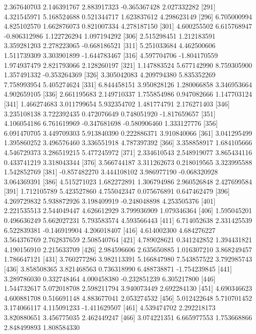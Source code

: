 \documentclass[12pt]{article}
\begin{document}
\begin{Schunk}
\begin{Soutput}
 [286]  2.367640703  2.146391767  2.883917323 -0.365367428  2.027332282
 [291]  4.321545971  5.168524688  0.521344717  1.623837612  4.298623149
 [296]  6.705000994  4.825102570  1.662876073  0.821007334  4.278187150
 [301]  4.600255502  6.615768947 -0.806312986  1.122726294  1.097194292
 [306]  2.515298451  1.212183591  3.359281203  2.278223065 -0.668186521
 [311]  5.251033684  4.462500606  1.511739309  3.303901899 -1.644783467
 [316]  4.597704706 -1.804170559  1.974937479  2.821793066  2.128260197
 [321]  1.147883524  5.677142990  8.759305900  1.357491332 -0.353264369
 [326]  3.305042083  4.209794380  5.835352269  7.758993954  5.405274624
 [331]  6.844458151  3.950828126  1.280066858  3.346953664  4.902659105
 [336]  2.661195683  2.149710337  1.755854986  0.947082666  1.147703124
 [341]  1.466274683  3.011799654  5.932354702  1.481774791  2.176271403
 [346]  3.235108138  3.722392435  0.472076649  0.748051920 -1.817659657
 [351]  4.106054186  6.761619969 -0.347681698 -0.580906460  1.333127776
 [356]  6.091470705  3.449709303  5.913840390  0.222886371  3.910840066
 [361]  3.041295499  1.395860252  3.496576460  3.336551918  4.787397392
 [366]  3.358858917  1.684105666  4.546729373  3.286519215  5.477245972
 [371]  2.334610543  2.548919077  3.865434116  0.433741219  3.318043344
 [376]  3.566744187  3.311262673  0.218019565  3.323995588  1.542852769
 [381] -0.857482270  3.444108102  3.986977190 -0.068320928  3.064369391
 [386]  4.515271023  1.682272891  1.306794986  2.960526848  2.427699584
 [391]  1.712105789  5.423527860  4.755042347  0.075676891  0.647462479
 [396]  4.269729832  5.938872926  3.198409919 -0.248048898  4.253505376
 [401]  2.221535513  2.544049447  4.626612929  3.799936909  1.079346364
 [406]  1.595045201  0.496636249  5.662027231  5.793583574  4.593566443
 [411]  6.714052638  2.331425539  6.522839381 -0.146919904  4.206018407
 [416]  4.614002300  4.684276227  3.564376769  2.762837659  2.508540764
 [421]  4.789028621  0.341242852  1.394431821  4.190156910  2.215633709
 [426]  2.984596606  2.635650885  1.016307210  3.868249457  1.786647121
 [431]  3.760277286  3.982113391  5.166847980  7.543857522  3.792985743
 [436]  3.858508365  3.821468563  0.736318990  6.488738871 -1.754239845
 [441]  3.289786030  0.332748464  4.000458380 -0.232851239  6.305217800
 [446]  1.544732617  5.072018708  2.598211794  3.940073449  2.692284130
 [451]  4.690346623  4.600881708  0.516691148  4.883677041  2.053274532
 [456]  5.012422648  5.710701452  3.174066117  4.115091233 -1.411629507
 [461]  4.539474702  2.292218173  3.820880651  3.456775035  2.462449247
 [466]  3.074221351  6.665977553  1.753668866  2.848499893  1.808584330

\end{Soutput}
\end{Schunk}
\end{document}
